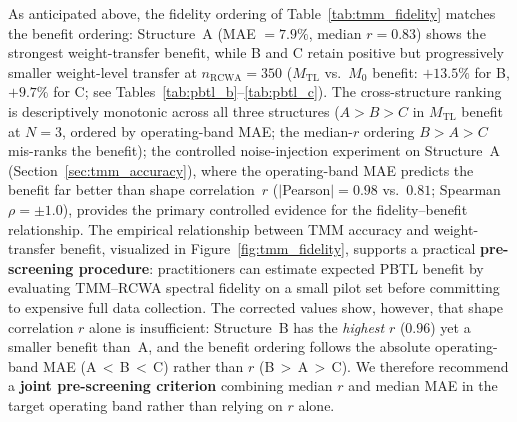 \documentclass[a4paper,fleqn]{cas-sc}
\newcommand{\Mzero}{M_0}
\newcommand{\Mtl}{M_\text{TL}}
\begin{document}
As anticipated above, the fidelity ordering of Table~\ref{tab:tmm_fidelity} matches the benefit ordering: Structure~A (MAE $= 7.9\%$, median $r = 0.83$) shows the strongest weight-transfer benefit, while B and C retain positive but progressively smaller weight-level transfer at $n_\mathrm{RCWA}=350$ ($\Mtl$ vs.\ $\Mzero$ benefit: $+13.5\%$ for B, $+9.7\%$ for C; see Tables~\ref{tab:pbtl_b}--\ref{tab:pbtl_c}). The cross-structure ranking is descriptively monotonic across all three structures ($A > B > C$ in $\Mtl$ benefit at $N=3$, ordered by operating-band MAE; the median-$r$ ordering $B > A > C$ mis-ranks the benefit); the controlled noise-injection experiment on Structure~A (Section~\ref{sec:tmm_accuracy}), where the operating-band MAE predicts the benefit far better than shape correlation~$r$ ($|$Pearson$|=0.98$ vs.\ $0.81$; Spearman $\rho=\pm1.0$), provides the primary controlled evidence for the fidelity--benefit relationship. The empirical relationship between TMM accuracy and weight-transfer benefit, visualized in Figure~\ref{fig:tmm_fidelity}, supports a practical \textbf{pre-screening procedure}: practitioners can estimate expected PBTL benefit by evaluating TMM--RCWA spectral fidelity on a small pilot set before committing to expensive full data collection. The corrected values show, however, that shape correlation $r$ alone is insufficient: Structure~B has the \emph{highest} $r$ ($0.96$) yet a smaller benefit than~A, and the benefit ordering follows the absolute operating-band MAE (A\,$<$\,B\,$<$\,C) rather than $r$ (B\,$>$\,A\,$>$\,C). We therefore recommend a \textbf{joint pre-screening criterion} combining median $r$ and median MAE in the target operating band rather than relying on $r$ alone.
\end{document}
